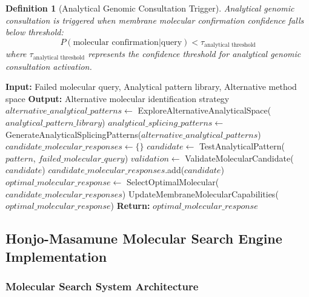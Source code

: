 \documentclass[11pt,a4paper]{article}
\newtheorem{definition}[theorem]{Definition}
\theoremstyle{remark}
\begin{document}
\begin{definition}[Analytical Genomic Consultation Trigger]
Analytical genomic consultation is triggered when membrane molecular confirmation confidence falls below threshold:
\begin{equation}
P(\text{molecular confirmation} | \text{query}) < \tau_{\text{analytical threshold}}
\end{equation}
where $\tau_{\text{analytical threshold}}$ represents the confidence threshold for analytical genomic consultation activation.
\end{definition}

\begin{algorithm}[H]
\caption{Sachikonye's Analytical Genomic Consultation Algorithm}
\begin{algorithmic}[1]
\State \textbf{Input:} Failed molecular query, Analytical pattern library, Alternative method space
\State \textbf{Output:} Alternative molecular identification strategy
\State $alternative\_analytical\_patterns \gets$ ExploreAlternativeAnalyticalSpace($analytical\_pattern\_library$)
\State $analytical\_splicing\_patterns \gets$ GenerateAnalyticalSplicingPatterns($alternative\_analytical\_patterns$)
\State $candidate\_molecular\_responses \gets \{\}$
\State $candidate \gets$ TestAnalyticalPattern($pattern$, $failed\_molecular\_query$)
\State $validation \gets$ ValidateMolecularCandidate($candidate$)
\State $candidate\_molecular\_responses$.add($candidate$)
\EndIf
\EndFor
\State $optimal\_molecular\_response \gets$ SelectOptimalMolecular($candidate\_molecular\_responses$)
\State UpdateMembraneMolecularCapabilities($optimal\_molecular\_response$)
\State \textbf{Return:} $optimal\_molecular\_response$
\EndProcedure
\end{algorithmic}
\end{algorithm}

\subsection{Honjo-Masamune Molecular Search Engine Implementation}

\subsubsection{Molecular Search System Architecture}
\end{document}
